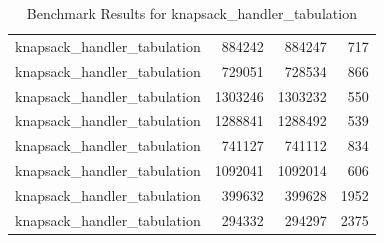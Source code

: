 \documentclass{llncs}
\begin{document}
\begin{table}[ht]
\begin{tabular}{@{}lrrr@{}}
        knapsack\_handler\_tabulation & 884242 & 884247 & 717 \\
        knapsack\_handler\_tabulation & 729051 & 728534 & 866 \\
        knapsack\_handler\_tabulation & 1303246 & 1303232 & 550 \\
        knapsack\_handler\_tabulation & 1288841 & 1288492 & 539 \\
        knapsack\_handler\_tabulation & 741127 & 741112 & 834 \\
        knapsack\_handler\_tabulation & 1092041 & 1092014 & 606 \\
        knapsack\_handler\_tabulation & 399632 & 399628 & 1952 \\
        knapsack\_handler\_tabulation & 294332 & 294297 & 2375 \\
        \bottomrule
    \end{tabular}
    \caption{Benchmark Results for knapsack\_handler\_tabulation}
\end{table}
\clearpage
\end{document}

